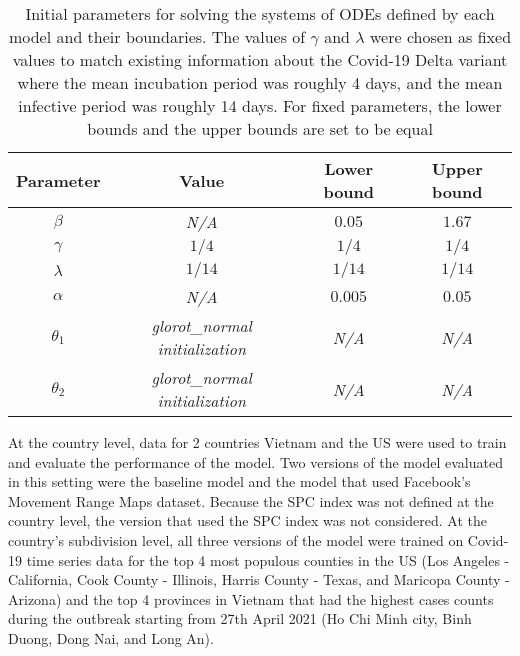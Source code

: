\begin{table}[h]
    \centering
    \begin{tabular}{| c | c | c | c |}
        Parameter & Value & Lower bound & Upper bound \\
        \hline\hline
        $\beta$ & \textit{N/A} & $0.05$ & $1.67$ \\
        \hline
        $\gamma$ & $1/4$ & $1/4$ & $1/4$ \\
        \hline
        $\lambda$ & $1/14$ & $1/14$ & $1/14$ \\
        \hline
        $\alpha$ & \textit{N/A} & $0.005$ & $0.05$ \\
        \hline
        $\theta_1$ & \textit{glorot\_normal initialization} & \textit{N/A} & \textit{N/A} \\
        \hline
        $\theta_2$ & \textit{glorot\_normal initialization} & \textit{N/A} & \textit{N/A} \\
        \hline
    \end{tabular}
    \caption{Initial parameters for solving the systems of \glspl{ODE} defined by each model and their boundaries. The values of $\gamma$ and $\lambda$ were chosen as fixed values to match existing information about the Covid-19 Delta variant \cite{mahaseDeltaVariantWhat2021} where the mean incubation period was roughly 4 days, and the mean infective period was roughly 14 days. For fixed parameters, the lower bounds and the upper bounds are set to be equal}
    \label{tab:ude-model-initial-parameters}
\end{table}

At the country level, data for 2 countries Vietnam and the \gls{US} were used to train and evaluate the performance of the model.
Two versions of the model evaluated in this setting were the baseline model and the model that used Facebook's Movement Range Maps dataset.
Because the \gls{SPC} index was not defined at the country level, the version that used the \gls{SPC} index was not considered.
At the country's subdivision level, all three versions of the model were trained on Covid-19 time series data for the top 4 most populous counties in the \gls{US} (Los Angeles - California, Cook County - Illinois, Harris County - Texas, and Maricopa County - Arizona) and the top 4 provinces in Vietnam that had the highest cases counts during the outbreak starting from 27th April 2021 (Ho Chi Minh city, Binh Duong, Dong Nai, and Long An).

